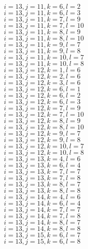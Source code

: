 \documentclass[14pt]{article}
\begin{document}
    $i=13,j=11,k=6,l=2 $ \\ 
    $i=13,j=11,k=6,l=3 $ \\ 
    $i=13,j=11,k=7,l=9 $ \\ 
    $i=13,j=11,k=7,l=10 $ \\ 
    $i=13,j=11,k=8,l=9 $ \\ 
    $i=13,j=11,k=8,l=10 $ \\ 
    $i=13,j=11,k=9,l=7 $ \\ 
    $i=13,j=11,k=9,l=8 $ \\ 
    $i=13,j=11,k=10,l=7 $ \\ 
    $i=13,j=11,k=10,l=8 $ \\ 
    $i=13,j=12,k=1,l=6 $ \\ 
    $i=13,j=12,k=2,l=6 $ \\ 
    $i=13,j=12,k=3,l=6 $ \\ 
    $i=13,j=12,k=6,l=1 $ \\ 
    $i=13,j=12,k=6,l=2 $ \\ 
    $i=13,j=12,k=6,l=3 $ \\ 
    $i=13,j=12,k=7,l=9 $ \\ 
    $i=13,j=12,k=7,l=10 $ \\ 
    $i=13,j=12,k=8,l=9 $ \\ 
    $i=13,j=12,k=8,l=10 $ \\ 
    $i=13,j=12,k=9,l=7 $ \\ 
    $i=13,j=12,k=9,l=8 $ \\ 
    $i=13,j=12,k=10,l=7 $ \\ 
    $i=13,j=12,k=10,l=8 $ \\ 
    $i=13,j=13,k=4,l=6 $ \\ 
    $i=13,j=13,k=6,l=4 $ \\ 
    $i=13,j=13,k=7,l=7 $ \\ 
    $i=13,j=13,k=7,l=8 $ \\ 
    $i=13,j=13,k=8,l=7 $ \\ 
    $i=13,j=13,k=8,l=8 $ \\ 
    $i=13,j=14,k=4,l=6 $ \\ 
    $i=13,j=14,k=6,l=4 $ \\ 
    $i=13,j=14,k=7,l=7 $ \\ 
    $i=13,j=14,k=7,l=8 $ \\ 
    $i=13,j=14,k=8,l=7 $ \\ 
    $i=13,j=14,k=8,l=8 $ \\ 
    $i=13,j=15,k=6,l=7 $ \\ 
    $i=13,j=15,k=6,l=8 $ \\ 
\end{document}
